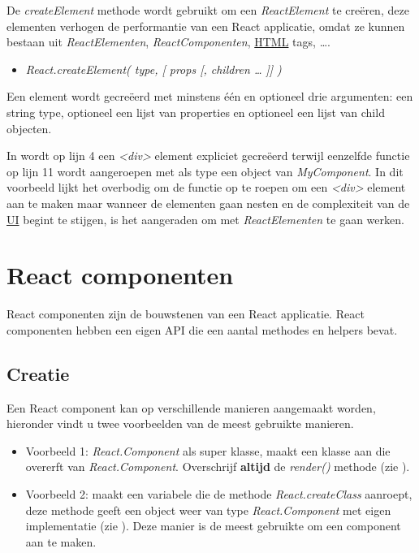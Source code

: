 		De \emph{createElement} methode wordt gebruikt om een \emph{ReactElement} te creëren, deze elementen verhogen de performantie van een React applicatie, omdat ze kunnen bestaan uit \emph{ReactElementen}, \emph{ReactComponenten}, \hyperref[html]{HTML} tags, \ldots.
		
		\begin{itemize}
			\item[] \emph{React.createElement( type, [ props [, children … ]] )}
		\end{itemize}
		
		Een element wordt gecreëerd met minstens één en optioneel drie argumenten: een string type, optioneel een lijst van properties en optioneel een lijst van child objecten.
		
		
		In  wordt op lijn 4 een \emph{<div>} element expliciet gecreëerd terwijl eenzelfde functie op lijn 11 wordt aangeroepen met als type een object van \emph{MyComponent}. In dit voorbeeld lijkt het overbodig om de functie op te roepen om een \emph{<div>} element aan te maken maar wanneer de elementen gaan nesten en de complexiteit van de \hyperref[ui]{UI} begint te stijgen, is het aangeraden om met \emph{ReactElementen} te gaan werken.
	
\section{React componenten}
	
	React componenten zijn de bouwstenen van een React applicatie. React componenten hebben een eigen API die een aantal methodes en helpers bevat.
	
	\subsection{Creatie}
		
		Een React component kan op verschillende manieren aangemaakt worden, hieronder vindt u twee voorbeelden van de meest gebruikte manieren.
		
		\begin{itemize}
			\item Voorbeeld 1: \emph{React.Component} als super klasse, maakt een klasse aan die overerft van \emph{React.Component}. Overschrijf \textbf{altijd} de \emph{render()} methode (zie ).
			\item Voorbeeld 2: maakt een variabele die de methode \emph{React.createClass} aanroept, deze methode geeft een object weer van type \emph{React.Component} met eigen implementatie (zie ). Deze manier is de meest gebruikte om een component aan te maken.
		\end{itemize}
	
